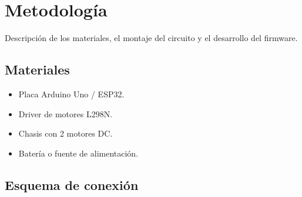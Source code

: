 \section{Metodología}

Descripción de los materiales, el montaje del circuito y el
desarrollo del firmware.

\subsection{Materiales}

\begin{itemize}
  \item Placa Arduino Uno / ESP32.
  \item Driver de motores L298N.
  \item Chasis con 2 motores DC.
  \item Batería o fuente de alimentación.
\end{itemize}

\subsection{Esquema de conexión}

